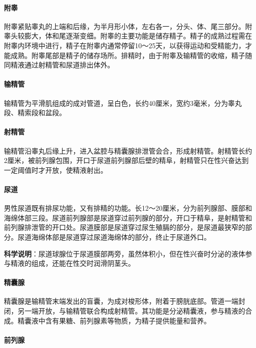 \begin{enumerate}
\paragraph{附睾}

附睾紧贴睾丸的上端和后缘，为半月形小体，左右各一，分头、体、尾三部分。附睾头较膨大，体和尾逐渐变细。附睾的主要功能是储存精子。精子的成熟过程需在附睾内环境中进行，精子在附睾内通常停留10～25天，以获得运动和受精能力，才能成熟。附睾尾部是精子的储存场所。排精时，由于附睾及输精管的收缩，精子随同精液通过射精管和尿道排出体外。

\paragraph{输精管}

输精管为平滑肌组成的成对管道，呈白色，长约40厘米，宽约3毫米，分为睾丸段、精索段和盆段。

\paragraph{射精管}

输精管沿睾丸后缘上升，进入盆腔与精囊腺排泄管会合，形成射精管。射精管长约2厘米，被前列腺包围，开口于尿道前列腺部后壁的精阜，射精管只在性兴奋达到一定阈值时才开放，使精液射出。

\paragraph{尿道}

男性尿道既有排尿功能，又有排精的功能。长12～20厘米，分为前列腺部、膜部和海绵体部三段。尿道前列腺部是尿道穿过前列腺的部分，开口于精阜，是射精管和前列腺排泄管的开口处。尿道膜部是尿道穿过尿生殖膈的部分，是尿道最狭窄的部分。尿道海绵体部是尿道穿过尿道海绵体的部分，终止于尿道外口。

\textbf{科学说明}：尿道球腺位于尿道膜部两旁，虽然体积小，但在性兴奋时分泌的液体参与精液的组成，还能在性交时润滑阴茎头。

\paragraph{精囊腺}

精囊腺是输精管末端发出的盲囊，为成对梭形体，附着于膀胱底部。管道一端封闭，另一端开放，与输精管联合构成射精管。其功能是分泌精囊液，参与精液的合成。精囊液中含有果糖、前列腺素等物质，为精子提供能量和营养。

\paragraph{前列腺}


\end{enumerate}
